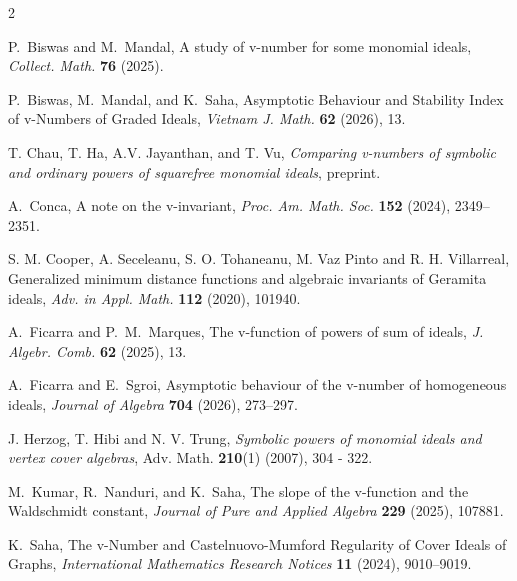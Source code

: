 \documentclass[12pt,amscd]{amsart}
\theoremstyle{definition}
\numberwithin{equation}{section}
\begin{document}
\begin{thebibliography}{2}




P.~Biswas and M.~Mandal,
A study of v-number for some monomial ideals, {\em Collect. Math. } {\bf 76} (2025).


P.~Biswas, M.~Mandal, and K.~Saha,
Asymptotic Behaviour and Stability Index of v-Numbers of Graded Ideals, {\em Vietnam J. Math.} {\bf 62} (2026), 13. 



 T. Chau, T. Ha, A.V. Jayanthan, and T. Vu, {\it Comparing v-numbers of symbolic and ordinary powers of squarefree monomial ideals},  preprint.

A.~Conca,
A note on the v-invariant, {\em Proc. Am. Math. Soc.} {\bf 152} (2024), 2349--2351.



S. M. Cooper, A. Seceleanu, S. O. Tohaneanu, M. Vaz Pinto and R. H. Villarreal, Generalized minimum distance functions and algebraic invariants of Geramita ideals,
{\em Adv. in Appl. Math.} {\bf 112} (2020), 101940.



A.~Ficarra and P.~M.~Marques,
The v-function of powers of sum of ideals, {\em J. Algebr. Comb.} {\bf 62} (2025), 13. 



A.~Ficarra and E.~Sgroi,
Asymptotic behaviour of the v-number of homogeneous ideals, {\em Journal of Algebra} {\bf 704} (2026), 273--297.

 J. Herzog, T. Hibi and N. V. Trung, {\it Symbolic powers of monomial ideals and vertex cover algebras},  Adv. Math. {\bf 210}(1) (2007), 304 - 322.


M.~Kumar, R.~Nanduri, and K.~Saha,
The slope of the v-function and the Waldschmidt constant, {\em Journal of Pure and Applied Algebra} {\bf 229} (2025), 107881.


K.~Saha,
The v-Number and Castelnuovo-Mumford Regularity of Cover Ideals of Graphs, {\em International Mathematics Research Notices} {\bf 11} (2024), 9010--9019.

\end{thebibliography}
\end{document}
